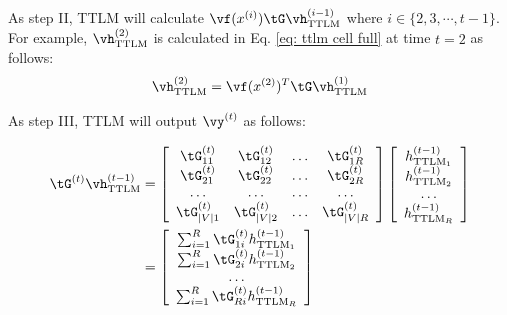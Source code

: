 \documentclass{article}
\theoremstyle{plain}
\theoremstyle{definition}
\theoremstyle{remark}
\begin{document}

As step II, TTLM will calculate 
$\vf(x^{(i)})\tG\vh^{(i-1)}_{\textrm{TTLM}}$ where $i \in \{2,3,\cdots,t-1\}$. For example, $\vh_{\textrm{TTLM}}^{(2)}$ is calculated in Eq. \ref{eq: ttlm cell full} at time $t= 2$ as follows: 
\begin{align}
    \vh_{\textrm{TTLM}}^{(2)} = \vf(x^{(2)})^T\tG  \vh^{(1)}_{\textrm{TTLM}} \nonumber 
\end{align}





As step III, TTLM will output $\vy^{(t)}$ as follows:

\begin{align}
\tG^{(t)}\vh^{(t-1)}_{\textrm{TTLM}} &= 
\left[\begin{array}{cccc}
\tG_{11}^{(t)} & \tG_{12}^{(t)} & \ldots & \tG_{1 R}^{(t)} \\
\tG_{21}^{(t)} & \tG_{22}^{(t)} & \ldots & \tG_{2 R}^{(t)} \\
\ldots & \ldots & \ldots & \ldots \\
\tG_{|V| 1}^{(t)} & \tG_{|V| 2}^{(t)} & \ldots & \tG_{|V| R}^{(t)}
\end{array}\right] \left[\begin{array}{c}
h^{(t-1)}_{{\textrm{TTLM}}_1} \\
h^{(t-1)}_{{\textrm{TTLM}}_2} \\
\ldots \\
h^{(t-1)}_{{\textrm{TTLM}}_R}
\end{array}\right] \nonumber \\ 
&= \left[\begin{array}{c}
\sum_{i=1}^{R}\tG_{1i}^{(t)} h^{(t-1)}_{{\textrm{TTLM}}_1}  \\
\sum_{i=1}^{R}\tG_{2i}^{(t)} h^{(t-1)}_{{\textrm{TTLM}}_2} \\
\ldots \\
\sum_{i=1}^{R}\tG_{Ri}^{(t)} h^{(t-1)}_{{\textrm{TTLM}}_R} 
\end{array}\right] \nonumber
\end{align}
\end{document}
